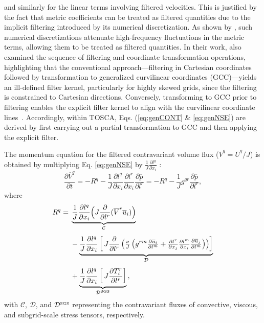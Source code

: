 \documentclass[final,3p]{elsarticle}
\begin{document}
and similarly for the linear terms involving filtered velocities. This is justified by the fact that metric coefficients can be treated as filtered quantities due to the implicit filtering introduced by its numerical discretization. As shown by \citet{jordan1999large}, such numerical discretizations attenuate high-frequency fluctuations in the metric terms, allowing them to be treated as filtered quantities. In their work, \citet{jordan1999large} also examined the sequence of filtering and coordinate transformation operations, highlighting that the conventional approach---filtering in Cartesian coordinates followed by transformation to generalized curvilinear coordinates (GCC)---yields an ill-defined filter kernel, particularly for highly skewed grids, since the filtering is constrained to Cartesian directions. Conversely, transforming to GCC prior to filtering enables the explicit filter kernel to align with the curvilinear coordinate lines~\cite{jordan1999large, armenio2000lagrangian}. Accordingly, within TOSCA, Eqs. (\ref{eq:genCONT} \& \ref{eq:genNSE}) are derived by first carrying out a partial transformation to GCC and then applying the explicit filter. 

The momentum equation for the filtered contravariant volume flux ($\overline{V}^q = \overline{U}^q/J$) is obtained by multiplying Eq. \ref{eq:genNSE} by $\frac{1}{J} \frac{\partial l^q}{\partial x_i}$ :
\begin{equation}
	\frac{\partial \overline{V}^{q}}{\partial t} = - R^{q} - \frac{1}{J} \frac{\partial l^q}{\partial x_i} \frac{\partial l^r}{\partial x_i}\frac{\partial \overline{p}}{\partial l^{r}} = - R^{q}-\frac{1}{J} g^{qr} \frac{\partial \overline{p}}{\partial l^{r}},
	\label{eq:genContraVolFlux}
\end{equation}
where
\begin{equation*}
	\begin{split}
		R^q ={}&
		\underbrace{%
			\frac{1}{J}\frac{\partial l^q}{\partial x_i}
			\Bigl(J\frac{\partial}{\partial l^r}(\overline{V}^r \overline{u}_i)\Bigr)
		}_{\mathcal{C}}
		\\[1ex]
		&- \underbrace{%
			\frac{1}{J}\frac{\partial l^q}{\partial x_i}
			\left[\,
			J\frac{\partial}{\partial l^r}
			\left(\tfrac{\nu}{J}\left(g^{rm}\tfrac{\partial \overline{u}_i}{\partial l^m}
			+\tfrac{\partial l^r}{\partial x_j}\tfrac{\partial l^m}{\partial x_i}\tfrac{\partial \overline{u}_j}{\partial l^m}
			\right)\right)
			\right]
		}_{\mathcal{D}}
		\\[1ex]
		&+ \underbrace{%
			\frac{1}{J}\frac{\partial l^q}{\partial x_i}
			\left[\,
			J\frac{\partial T^r_i}{\partial l^r}
			\right]
		}_{\mathcal{D}^{\mathrm{SGS}}}\,,
	\end{split}
\end{equation*}
with $\mathcal{C}$, $\mathcal{D}$, and $\mathcal{D}^{\hbox{\tiny SGS}}$ representing the contravariant fluxes of convective, viscous, and subgrid-scale stress tensors, respectively.
\end{document}
